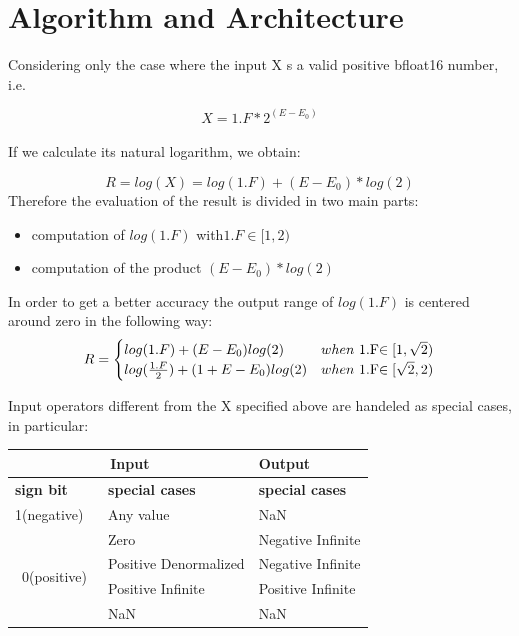\documentclass{report}
\begin{document}
\chapter{Algorithm and Architecture}
Considering only the case where the input X s a valid positive bfloat16 number, i.e.

$$X=1.F*2^{(E-E_0)}$$
\\If we calculate its natural logarithm, we obtain:

$$R = log(X) = log(1.F)+(E-E_0)*log(2)$$
Therefore the evaluation of the result is divided in two main parts:
\begin{itemize}
\item computation of $log(1.F)$ with$ 1.F \in [1,2)$
\item computation of the product $(E-E_0)*log(2)$
\end{itemize}
In order to get a better accuracy the output range of $log(1.F)$ is centered around zero in the following way:
\[
R=
\begin{cases}
        log(1.F)+(E-E_0)log(2)  & when  $ 1.F$ \in[1,\sqrt{2})\\
        log(\frac{1.F}{2})+(1+E-E_0)log(2) & when  $ 1.F$ \in[\sqrt{2},2)
\end{cases}
\]

Input operators different from the X specified above are handeled as special cases, in particular:


\begin{table}[ht]
\centering
\begin{tabular}{|l|l|l|} 
\hline
\multicolumn{2}{|c|}{\textbf{Input}}                                          & \textbf{Output}         \\ 
\hline
\textbf{sign bit}               & \multicolumn{1}{|l|}{\textbf{special cases}} & \textbf{special cases}  \\ 
\hline
1(negative)                     & Any value                                   & NaN                     \\ 
\cline{1-1}
\multirow{4}{*}{~0(positive)~} & Zero                                        & Negative Infinite       \\
                                & Positive Denormalized                       & Negative Infinite       \\
                                & Positive Infinite                           & Positive Infinite       \\
                                & NaN                                         & NaN                     \\
\hline
\end{tabular}
\end{table}
\end{document}
